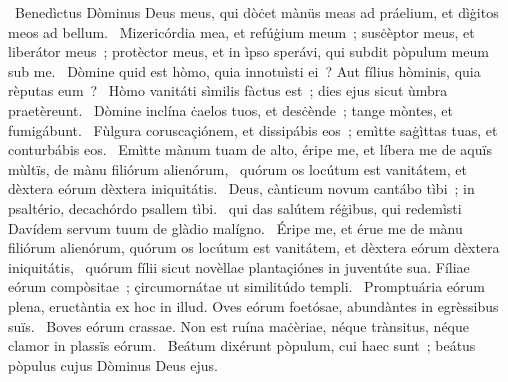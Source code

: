 ~Benedìctus Dòminus Deus meus, qui dòċet mànüs meas ad práelium, et dìġitos meos ad bellum. 
~Mizericórdia mea, et refúġium meum~; susċèptor meus, et liberátor meus~; protèctor meus, et in ìpso sperávi, qui subdit pòpulum meum sub me. 
~Dòmine quid est hòmo, quia innotuìsti ei~? Aut fílius hòminis, quia rèputas eum~? 
~Hòmo vanitáti sìmilis fàctus est~; dies ejus sicut ùmbra praetèreunt. 
~Dòmine inclína ċaelos tuos, et desċènde~; tange mòntes, et fumigábunt. 
~Fùlgura coruscaçiónem, et dissipábis eos~; emìtte saġìttas tuas, et conturbábis eos. 
~Emìtte mànum tuam de alto, éripe me, et líbera me de aquïs mùltïs, de mànu filiórum alienórum, 
~quórum os locútum est vanitátem, et dèxtera eórum dèxtera iniquitátis. 
~Deus, cànticum novum cantábo tìbi~; in psaltério, decachórdo psallem tìbi. 
~qui das salútem réġibus, qui redemìsti Davídem servum tuum de glàdio malígno. 
~Éripe me, et érue me de mànu filiórum alienórum, quórum os locútum est vanitátem, et dèxtera eórum dèxtera iniquitátis, 
~quórum fílii sicut novèllae plantaçiónes in juventúte sua. Fíliae eórum compòsitae~; çircumornátae ut similitúdo templi. 
~Promptuária eórum plena, eructàntia ex hoc in illud. Oves eórum foetósae, abundàntes in egrèssibus suïs. 
~Boves eórum crassae. Non est ruína maċèriae, néque trànsitus, néque clamor in plassïs eórum. 
~Beátum dixérunt pòpulum, cui haec sunt~; beátus pòpulus cujus Dòminus Deus ejus. 

